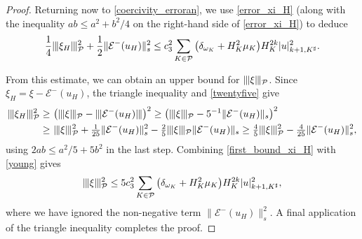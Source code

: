 \documentclass[11pt,final]{amsart}
\theoremstyle{plain}
\theoremstyle{definition}
\newcommand\calP{{\mathcal{P}}}
\newcommand{\mesh}{\calP}
\newcommand{\ndg}[1]{| \kern -.25mm \|{#1}| \kern -.25mm \|}
\newcommand{\ndgp}[1]{| \kern -.25mm \|{#1}| \kern -.25mm \|_{\rm \mesh}}
\newcommand{\norm}[2]{\|{#1}\|_{{#2}}}
\renewcommand{\k}{K}
\newcommand{\ksh}{{K^{\sharp}}}
\begin{document}
\begin{proof}
Returning now to \eqref{coercivity_erroran}, we use \eqref{error_xi_H}
(along with the inequality $ab\le a^2+b^2/4$ on the right-hand side of
\eqref{error_xi_H}) to deduce
\begin{equation}\label{first_bound_xi_H}
\frac{1}{4}\ndgp{\xi_H}^2+\frac{1}{2}\norm{\mathcal{E}^-(u_H)}{s}^2\le  c_3^2\sum_{\k\in\mesh}\big(\delta_{\omega_\k}+ H_\k^2\mu_\k\big)
H_{\k}^{2k} |u|_{k+1,\ksh}^2.
\end{equation}

From this estimate, we can obtain an upper bound for $\ndgp{\xi}$. Since
$\xi_H=\xi-\mathcal{E}^-(u_H)$, the triangle inequality and
\eqref{twentyfive} give 
\begin{equation}\label{young}
	\begin{aligned}
		\ndgp{\xi_H}^2\ge&\  \big(\ndgp{\xi}-\ndg{\mathcal{E}^-(u_H)}\big)^2\ge  \big(\ndgp{\xi}-5^{-1}\norm{\mathcal{E}^-(u_H)}{s}\big)^2\\
		\ge&\  \ndgp{\xi}^2 +\tfrac{1}{25}\norm{\mathcal{E}^-(u_H)}{s}^2 -\tfrac{2}{5} \ndgp{\xi}\norm{\mathcal{E}^-(u_H)}{s}
		\ge \tfrac{4}{5}\ndgp{\xi}^2 -\tfrac{4}{25}\norm{\mathcal{E}^-(u_H)}{s}^2, 
	\end{aligned}
\end{equation}
using $2ab\le a^2/5+5b^2$ in the last step. Combining
\eqref{first_bound_xi_H} with \eqref{young} gives
\begin{equation}\label{second_bound_xi}
	\ndgp{\xi}^2\le  5c_3^2\sum_{\k\in\mesh}\big(\delta_{\omega_\k}+ H_\k^2\mu_\k\big)
	H_{\k}^{2k} |u|_{k+1,\ksh}^2,
\end{equation}
where we have ignored the non-negative term
$\norm{\mathcal{E}^-(u_H)}{s}^2$. A final application of the triangle
inequality completes the proof.
\end{proof}
\end{document}
